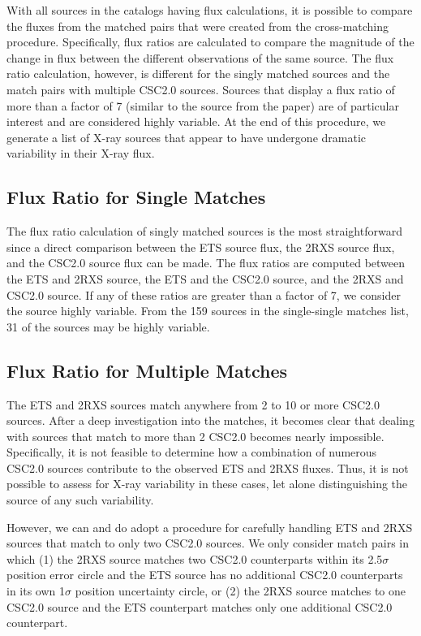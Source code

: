 With all sources in the catalogs having flux calculations, it is possible to compare the fluxes from the matched pairs that were created from the cross-matching procedure. 
Specifically, flux ratios are calculated to compare the magnitude of the change in flux between the different observations of the same source. 
The flux ratio calculation, however, is different for the singly matched sources and the match pairs with multiple CSC2.0 sources. 
Sources that display a flux ratio of more than a factor of 7 (similar to the source from the \cite{LaMassa2015} paper)  are of particular interest and are considered highly variable. 
At the end of this procedure, we generate a list of X-ray sources that appear to have undergone dramatic variability in their X-ray flux.


\subsection{Flux Ratio for Single Matches}

The flux ratio calculation of singly matched sources is the most straightforward since a direct comparison between the ETS source flux, the 2RXS source flux, and the CSC2.0 source flux can be made. 
The flux ratios are computed between the ETS and 2RXS source, the ETS and the CSC2.0 source, and the 2RXS and CSC2.0 source. 
If any of these ratios are greater than a factor of 7, we consider the source highly variable. 
From the 159 sources in the single-single matches list, 31 of the sources may be highly variable.



\subsection{Flux Ratio for Multiple Matches}

The ETS and 2RXS sources match anywhere from 2 to 10 or more CSC2.0 sources.
After a deep investigation into the matches, it becomes clear that dealing with sources that match to more than 2 CSC2.0 becomes nearly impossible.
Specifically, it is not feasible to determine how a combination of numerous CSC2.0 sources contribute to the observed ETS and 2RXS fluxes.
Thus, it is not possible to assess for X-ray variability in these cases, let alone distinguishing the source of any such variability.

However, we can and do adopt a procedure for carefully handling ETS and 2RXS sources that match to only two CSC2.0 sources.
We only consider match pairs in which (1) the 2RXS source matches two CSC2.0 counterparts within its 2.5$\sigma$ position error circle and the ETS source has no additional CSC2.0 counterparts in its own 1$\sigma$ position uncertainty circle, or (2) the 2RXS source matches to one CSC2.0 source and the ETS counterpart matches only one additional CSC2.0 counterpart.

